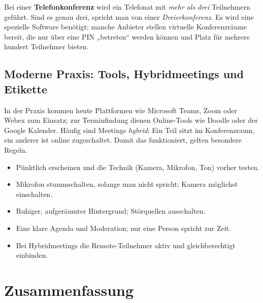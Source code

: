 \documentclass[11pt, a4paper]{article}
\begin{document}
Bei einer \textbf{Telefonkonferenz} wird ein Telefonat mit \emph{mehr als drei} Teilnehmern
geführt. Sind es genau drei, spricht man von einer \emph{Dreierkonferenz}. Es wird eine
spezielle Software benötigt; manche Anbieter stellen virtuelle Konferenzräume bereit, die nur
über eine PIN „betreten“ werden können und Platz für mehrere hundert Teilnehmer bieten.

\subsection{Moderne Praxis: Tools, Hybridmeetings und Etikette}

In der Praxis kommen heute Plattformen wie Microsoft Teams, Zoom oder Webex zum Einsatz; zur
Terminfindung dienen Online-Tools wie Doodle oder der Google Kalender. Häufig sind Meetings
\emph{hybrid}: Ein Teil sitzt im Konferenzraum, ein anderer ist online zugeschaltet. Damit
das funktioniert, gelten besondere Regeln.

\begin{merksatz}[title={\bfseries Etikette für Video- und Hybridkonferenzen}]
\begin{itemize}[itemsep=1pt]
  \item Pünktlich erscheinen und die Technik (Kamera, Mikrofon, Ton) vorher testen.
  \item Mikrofon stummschalten, solange man nicht spricht; Kamera möglichst einschalten.
  \item Ruhiger, aufgeräumter Hintergrund; Störquellen ausschalten.
  \item Eine klare Agenda und Moderation; nur eine Person spricht zur Zeit.
  \item Bei Hybridmeetings die Remote-Teilnehmer aktiv und gleichberechtigt einbinden.
\end{itemize}
\end{merksatz}

\section{Zusammenfassung}
\end{document}
